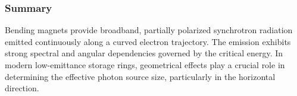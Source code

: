 
\subsubsection{Summary}

Bending magnets provide broadband, partially polarized synchrotron radiation emitted continuously along a curved electron trajectory. The emission exhibits strong spectral and angular dependencies governed by the critical energy. In modern low-emittance storage rings, geometrical effects play a crucial role in determining the effective photon source size, particularly in the horizontal direction.

% 